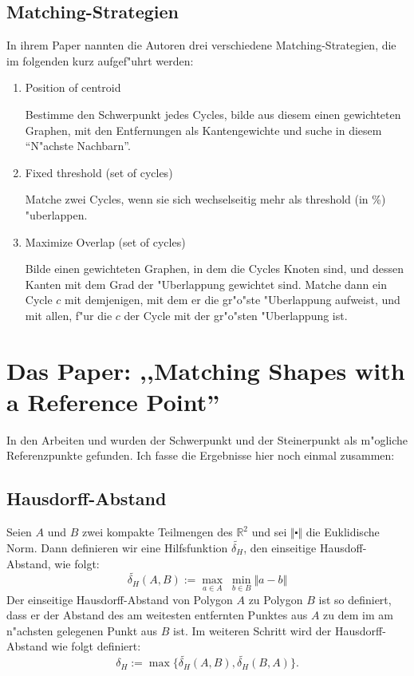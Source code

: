 \subsection{Matching-Strategien}
In ihrem Paper nannten die Autoren drei verschiedene Matching-Strategien, die im folgenden kurz aufgef"uhrt werden:
\begin{enumerate}
\item Position of centroid

Bestimme den Schwerpunkt jedes Cycles,  bilde aus diesem einen gewichteten Graphen, mit den Entfernungen als Kantengewichte und suche in diesem "`N"achste Nachbarn"'.
\item Fixed threshold (set of cycles)

Matche zwei Cycles, wenn sie sich wechselseitig  mehr als threshold (in \%) "uberlappen.

\item Maximize Overlap (set of cycles)

Bilde einen gewichteten Graphen, in dem die Cycles Knoten sind, und dessen Kanten mit dem Grad der "Uberlappung gewichtet sind. Matche dann ein Cycle $c$ mit demjenigen, mit dem er die gr"o"ste "Uberlappung aufweist, und mit allen, f"ur die $c$ der Cycle mit der gr"o"sten "Uberlappung ist.
\end{enumerate} 

\section{Das Paper: ,,Matching Shapes with a Reference Point''  }


In den Arbeiten \cite{AAR} und  \cite{AFRW} wurden der Schwerpunkt und der Steinerpunkt als m"ogliche Referenzpunkte gefunden. Ich fasse die Ergebnisse hier noch einmal zusammen:

\subsection{Hausdorff-Abstand}

Seien $A$ und $B$ zwei kompakte Teilmengen des $\mathbb{R}^2$ und sei $\Vert\centerdot\Vert$ die Euklidische Norm.
Dann definieren wir eine Hilfsfunktion $ \widetilde{\delta_H}  $, den einseitige Hausdoff-Abstand, wie folgt:
\[ \widetilde{\delta_H}(A,B):=\max_{a\in A} \;\min_{b\in B} \Vert a-b \Vert\]
Der einseitige Hausdorff-Abstand von Polygon $A$ zu Polygon $B$ ist so definiert, dass er der Abstand des am weitesten entfernten Punktes aus $A$ zu dem im am n"achsten gelegenen Punkt aus $B$ ist.  Im weiteren Schritt wird der Hausdorff-Abstand wie folgt definiert: 
\[\delta_H:=\max\{\widetilde{\delta_H}(A,B),\widetilde{\delta_H}(B,A)\}.\]


